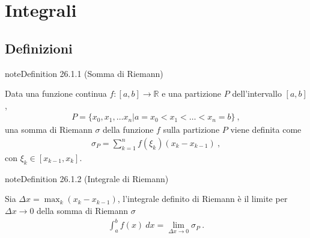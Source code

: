 \documentclass[letterpaper,10pt,italian]{jupyterBook}
\begin{document}
\chapter{Integrali}
\label{\detokenize{ch/infinitesimal_calculus/integrals:integrali}}\label{\detokenize{ch/infinitesimal_calculus/integrals:infinitesimal-calculus-integrals}}\label{\detokenize{ch/infinitesimal_calculus/integrals::doc}}

\section{Definizioni}
\label{\detokenize{ch/infinitesimal_calculus/integrals:definizioni}}\label{\detokenize{ch/infinitesimal_calculus/integrals:infinitesimal-calculus-integrals-def}}\label{ch/infinitesimal_calculus/integrals:infinitesimal-calculus:integrals:def:riemann-sum}
\begin{sphinxadmonition}{note}{Definition 26.1.1 (Somma di Riemann)}



\sphinxAtStartPar
Data una funzione continua \(f: [a,b] \rightarrow \mathbb{R}\) e una partizione \(P\) dell’intervallo \([a,b]\),
\begin{equation*}
\begin{split}P = \{ x_0, x_1, \dots x_n | a = x_0 < x_1 < \dots < x_n = b \} \ ,\end{split}
\end{equation*}
\sphinxAtStartPar
una somma di Riemann \(\sigma\) della funzione \(f\) sulla partizione \(P\) viene definita come
\begin{equation}\label{equation:ch/infinitesimal_calculus/integrals:infinitesimal-calculus:integrals:riemann:sum}
\begin{split}\sigma_P = \sum_{k=1}^{n} f(\xi_k) (x_{k} - x_{k-1}) \ ,\end{split}
\end{equation}
\sphinxAtStartPar
con \(\xi_k \in [x_{k-1}, x_k]\).
\end{sphinxadmonition}
\label{ch/infinitesimal_calculus/integrals:infinitesimal-calculus:integrals:def:riemann-integral}
\begin{sphinxadmonition}{note}{Definition 26.1.2 (Integrale di Riemann)}



\sphinxAtStartPar
Sia \(\Delta x = \max_k (x_{k} - x_{k-1})\), l’integrale definito di Riemann è  il limite per \(\Delta x \rightarrow 0\) della somma di Riemann \(\sigma\)
\begin{equation}\label{equation:ch/infinitesimal_calculus/integrals:infinitesimal-calculus:integrals:riemann:def}
\begin{split}\int_a^b f(x) \ dx = \lim_{\Delta x \rightarrow 0} \sigma_P \ .\end{split}
\end{equation}\end{sphinxadmonition}
\end{document}
